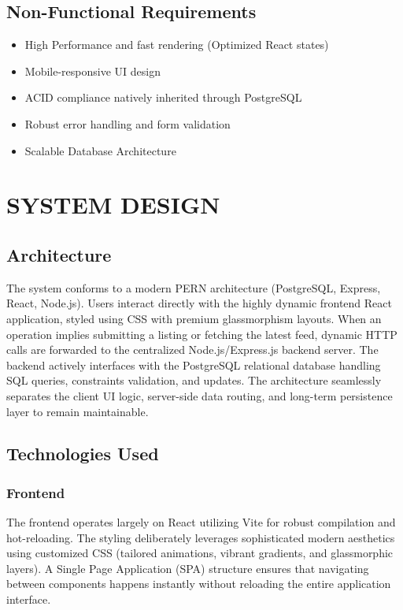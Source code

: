 \documentclass[a4paper,12pt]{report}
\begin{document}
\section{Non-Functional Requirements}
\begin{itemize}
\item High Performance and fast rendering (Optimized React states)
\item Mobile-responsive UI design
\item ACID compliance natively inherited through PostgreSQL
\item Robust error handling and form validation
\item Scalable Database Architecture
\end{itemize}

\chapter{SYSTEM DESIGN}

\section{Architecture}

The system conforms to a modern PERN architecture (PostgreSQL, Express, React, Node.js). Users interact directly with the highly dynamic frontend React application, styled using CSS with premium glassmorphism layouts. When an operation implies submitting a listing or fetching the latest feed, dynamic HTTP calls are forwarded to the centralized Node.js/Express.js backend server. The backend actively interfaces with the PostgreSQL relational database handling SQL queries, constraints validation, and updates. The architecture seamlessly separates the client UI logic, server-side data routing, and long-term persistence layer to remain maintainable.

\section{Technologies Used}

\subsection{Frontend}
The frontend operates largely on React utilizing Vite for robust compilation and hot-reloading. The styling deliberately leverages sophisticated modern aesthetics using customized CSS (tailored animations, vibrant gradients, and glassmorphic layers). A Single Page Application (SPA) structure ensures that navigating between components happens instantly without reloading the entire application interface. 
\end{document}
